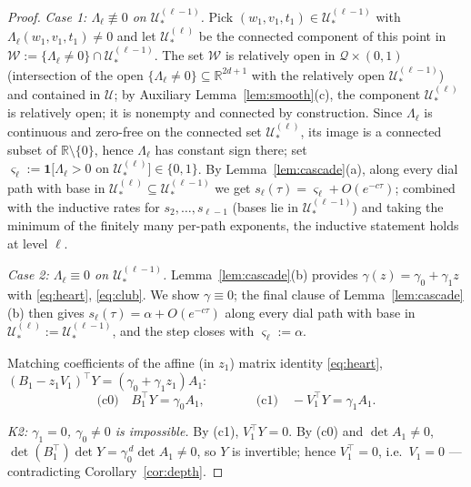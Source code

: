 \documentclass[11pt]{article}
\theoremstyle{definition}
\theoremstyle{remark}
\theoremstyle{plain}
\newcommand{\R}{\mathbb{R}}
\newcommand{\cQ}{\mathcal{Q}}
\newcommand{\cU}{\mathcal{U}}
\newcommand{\cW}{\mathcal{W}}
\begin{document}
\begin{proof}
\emph{Case 1: $\Lambda_\ell\not\equiv0$ on $\cU^{(\ell-1)}_*$.}  Pick
$(w_1,v_1,t_1)\in\cU^{(\ell-1)}_*$ with $\Lambda_\ell(w_1,v_1,t_1)\neq0$ and let
$\cU^{(\ell)}_*$ be the connected component of this point in
$\cW:=\{\Lambda_\ell\neq0\}\cap\cU^{(\ell-1)}_*$.  The set $\cW$ is relatively open in
$\cQ\times(0,1)$ (intersection of the open $\{\Lambda_\ell\neq0\}\subseteq\R^{2d+1}$
with the relatively open $\cU^{(\ell-1)}_*$) and contained in $\cU$; by Auxiliary
Lemma~\ref{lem:smooth}(c), the component $\cU^{(\ell)}_*$ is relatively open; it is
nonempty and connected by construction.  Since $\Lambda_\ell$ is continuous and
zero-free on the connected set $\cU^{(\ell)}_*$, its image is a connected subset of
$\R\setminus\{0\}$, hence $\Lambda_\ell$ has constant sign there; set
$\varsigma_\ell:=\mathbf 1\big[\Lambda_\ell>0\text{ on }\cU^{(\ell)}_*\big]\in\{0,1\}$.
By Lemma~\ref{lem:cascade}(a), along every dial path with base in
$\cU^{(\ell)}_*\subseteq\cU^{(\ell-1)}_*$ we get
$s_\ell(\tau)=\varsigma_\ell+O(e^{-c\tau})$; combined with the inductive rates for
$s_2,\dots,s_{\ell-1}$ (bases lie in $\cU^{(\ell-1)}_*$) and taking the minimum of the
finitely many per-path exponents, the inductive statement holds at level $\ell$.

\emph{Case 2: $\Lambda_\ell\equiv0$ on $\cU^{(\ell-1)}_*$.}
Lemma~\ref{lem:cascade}(b) provides $\gamma(z)=\gamma_0+\gamma_1z$ with
\eqref{eq:heart}, \eqref{eq:club}.  We show $\gamma\equiv0$; the final clause of
Lemma~\ref{lem:cascade}(b) then gives $s_\ell(\tau)=\alpha+O(e^{-c\tau})$ along every
dial path with base in $\cU^{(\ell)}_*:=\cU^{(\ell-1)}_*$, and the step closes with
$\varsigma_\ell:=\alpha$.

Matching coefficients of the affine (in $z_1$) matrix identity \eqref{eq:heart},
$(B_1-z_1V_1)^\top Y=(\gamma_0+\gamma_1z_1)A_1$:
\[
\text{(c0)}\quad B_1^\top Y=\gamma_0A_1,
\qquad\qquad
\text{(c1)}\quad -V_1^\top Y=\gamma_1A_1 .
\]

\emph{K2: $\gamma_1=0$, $\gamma_0\neq0$ is impossible.}  By (c1), $V_1^\top Y=0$.  By
(c0) and $\det A_1\neq0$,
$\det(B_1^\top)\det Y=\gamma_0^{\,d}\det A_1\neq0$, so $Y$ is invertible; hence
$V_1^\top=0$, i.e.\ $V_1=0$ --- contradicting Corollary~\ref{cor:depth}.


\end{proof}
\end{document}
